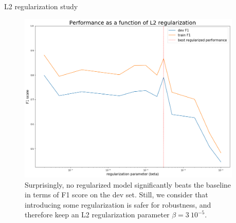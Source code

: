 \documentclass[final]{beamer}
\newlength{\sepwid}
\newlength{\onecolwid}
\newlength{\twocolwid}
\begin{document}
\begin{frame}[t]
\begin{columns}[t]
\begin{column}{\twocolwid}
\begin{columns}[t,totalwidth=\twocolwid]
\begin{column}{\onecolwid}

\begin{block}{L2 regularization study}

\begin{figure}
\begin{center}
\includegraphics[width=600px]{figs/l2_graph.png}
\caption{Surprisingly, no regularized model significantly beats the baseline in terms of F1 score on the dev set. Still, we consider that introducing some regularization is safer for robustness, and therefore keep an L2 regularization parameter $\beta=3~10^{-5}$. }
\label{l2}
\end{center}
\end{figure}

\end{block}


\end{column} %

\end{columns} %

\end{column} %

\begin{column}{\sepwid}\end{column} %


\end{columns}
\end{frame}
\end{document}
